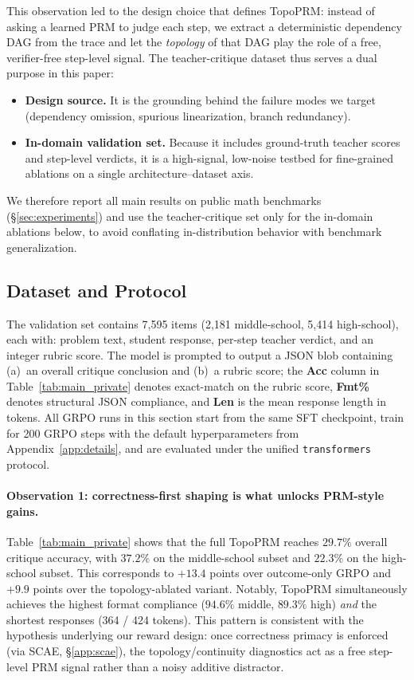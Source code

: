     This observation led to the design choice that defines TopoPRM: instead of asking a learned PRM to judge each step, we extract a deterministic dependency DAG from the trace and let the \emph{topology} of that DAG play the role of a free, verifier-free step-level signal. The teacher-critique dataset thus serves a dual purpose in this paper:
    \begin{itemize}[leftmargin=*,itemsep=2pt]
        \item \textbf{Design source.} It is the grounding behind the failure modes we target (dependency omission, spurious linearization, branch redundancy).
        \item \textbf{In-domain validation set.} Because it includes ground-truth teacher scores and step-level verdicts, it is a high-signal, low-noise testbed for fine-grained ablations on a single architecture--dataset axis.
    \end{itemize}
    We therefore report all main results on public math benchmarks (\S\ref{sec:experiments}) and use the teacher-critique set only for the in-domain ablations below, to avoid conflating in-distribution behavior with benchmark generalization.
    
    \subsection{Dataset and Protocol}
    The validation set contains 7{,}595 items (2{,}181 middle-school, 5{,}414 high-school), each with: problem text, student response, per-step teacher verdict, and an integer rubric score. The model is prompted to output a JSON blob containing (a)~an overall critique conclusion and (b)~a rubric score; the \textbf{Acc} column in Table~\ref{tab:main_private} denotes exact-match on the rubric score, \textbf{Fmt\%} denotes structural JSON compliance, and \textbf{Len} is the mean response length in tokens. All GRPO runs in this section start from the same SFT checkpoint, train for 200 GRPO steps with the default hyperparameters from Appendix~\ref{app:details}, and are evaluated under the unified \texttt{transformers} protocol.
    
    
    
    \paragraph{Observation 1: correctness-first shaping is what unlocks PRM-style gains.}
    Table~\ref{tab:main_private} shows that the full TopoPRM reaches $29.7\%$ overall critique accuracy, with $37.2\%$ on the middle-school subset and $22.3\%$ on the high-school subset. This corresponds to $+13.4$ points over outcome-only GRPO and $+9.9$ points over the topology-ablated variant. Notably, TopoPRM simultaneously achieves the highest format compliance ($94.6\%$ middle, $89.3\%$ high) \emph{and} the shortest responses (364 / 424 tokens). This pattern is consistent with the hypothesis underlying our reward design: once correctness primacy is enforced (via SCAE, \S\ref{app:scae}), the topology/continuity diagnostics act as a free step-level PRM signal rather than a noisy additive distractor.
    
